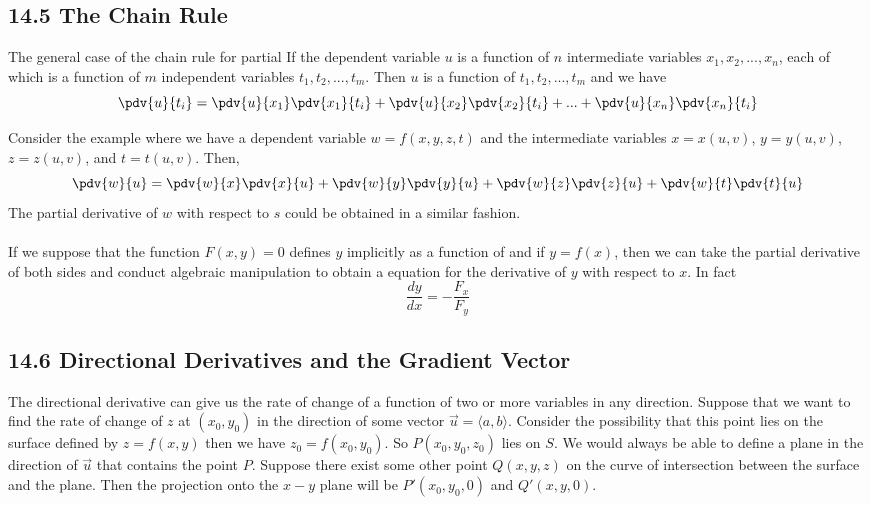 \documentclass{article}
\begin{document}
	\subsection{14.5 The Chain Rule}
	\begin{mybox}
		{The general case of the chain rule for partial} If the dependent variable $u$
		is a function of $n$ intermediate variables $x_{1},x_{2},...,x_{n}$, each of
		which is a function of $m$ independent variables $t_{1}, t_{2},..., t_{m}$. Then
		$u$ is a function of $t_{1}, t_{2},...,t_{m}$ and we have
		\[
			\pdv{u}{t_i}= \pdv{u}{x_1}\pdv{x_1}{t_i}+ \pdv{u}{x_2}\pdv{x_2}{t_i}+...+\pdv
			{u}{x_n}\pdv{x_n}{t_i}
		\]
	\end{mybox}
	Consider the example where we have a dependent variable $w= f(x,y,z,t)$ and
	the intermediate variables $x=x(u,v)$, $y=y(u,v)$, $z=z(u,v)$, and $t=t(u,v)$.
	Then,
	\[
		\pdv{w}{u}=\pdv{w}{x}\pdv{x}{u}+ \pdv{w}{y}\pdv{y}{u}+ \pdv{w}{z}\pdv{z}{u}+
		\pdv{w}{t}\pdv{t}{u}
	\]
	The partial derivative of $w$ with respect to $s$ could be obtained in a similar
	fashion. \\\\ If we suppose that the function $F(x,y)=0$ defines $y$ implicitly
	as a function of and if $y=f(x)$, then we can take the partial derivative of
	both sides and conduct algebraic manipulation to obtain a equation for the
	derivative of $y$ with respect to $x$. In fact\\
	\[
		\frac{dy}{dx}= -\frac{F_{x}}{F_{y}}
	\]

	\subsection{14.6 Directional Derivatives and the Gradient Vector}
	The directional derivative can give us the rate of change of a function of two
	or more variables in any direction. Suppose that we want to find the rate of
	change of $z$ at $(x_{0},y_{0})$ in the direction of some vector
	$\vec{u}= \langle a, b \rangle$. Consider the possibility that this point lies
	on the surface defined by $z=f(x,y)$ then we have $z_{0} = f(x_{0},y_{0})$. So
	$P(x_{0},y_{0},z_{0})$ lies on $S$. We would always be able to define a plane in
	the direction of $\vec{u}$ that contains the point $P$. Suppose there exist
	some other point $Q(x,y,z)$ on the curve of intersection between the surface
	and the plane. Then the projection onto the $x-y$ plane will be $P'(x_{0},y_{0}
	,0)$ and $Q'(x,y,0)$.
\end{document}
